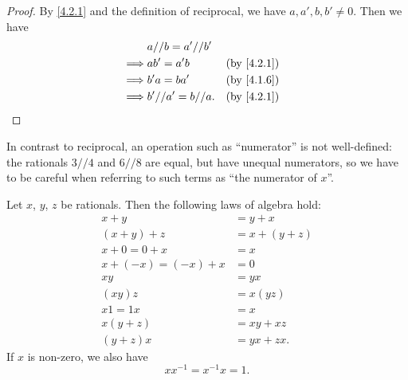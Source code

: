 \begin{proof}
  By \cref{4.2.1} and the definition of reciprocal, we have \(a, a', b, b' \neq 0\).
  Then we have
  \begin{align*}
             & a // b = a' // b'                  \\
    \implies & ab' = a'b          &  & \by{4.2.1} \\
    \implies & b'a = ba'          &  & \by{4.1.6} \\
    \implies & b' // a' = b // a. &  & \by{4.2.1}
  \end{align*}
\end{proof}

\begin{note}
  In contrast to reciprocal, an operation such as ``numerator'' is not well-defined:
  the rationals \(3 // 4\) and \(6 // 8\) are equal, but have unequal numerators, so we have to be careful when referring to such terms as ``the numerator of \(x\)''.
\end{note}

\begin{prop}\label{4.2.4}
  Let \(x\), \(y\), \(z\) be rationals.
  Then the following laws of algebra hold:
  \begin{align*}
    x + y               & = y + x       \\
    (x + y) + z         & = x + (y + z) \\
    x + 0 = 0 + x       & = x           \\
    x + (-x) = (-x) + x & = 0           \\
    xy                  & = yx          \\
    (xy)z               & = x(yz)       \\
    x1 = 1x             & = x           \\
    x(y + z)            & = xy + xz     \\
    (y + z)x            & = yx + zx.
  \end{align*}
  If \(x\) is non-zero, we also have
  \[
    xx^{-1} = x^{-1}x = 1.
  \]
\end{prop}

